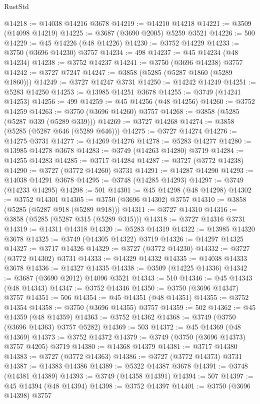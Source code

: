 \begin{lexlean}{RustStd}
\begin{coremodule}
@14218 := @14038 @14216 @3678
@14219 := @14210 @14218
@14221 := @3509 (@14098 @14219)
@14225 := @3687 (@3690 @2005) @5259 @3521
@14226 := 500
@14229 := @45 @14226 (@48 @14226)
@14230 := @3752 @14229
@14233 := @3750 (@3696 @14230) @3757
@14234 := 498
@14237 := @45 @14234 (@48 @14234)
@14238 := @3752 @14237
@14241 := @3750 (@3696 @14238) @3757
@14242 := @3727 @7247
@14247 := @3858 (@5285 (@5287 @1860 (@5289 @1860)))
@14249 := @3727 @14247 @3731
@14250 := @14242 @14249
@14251 := @5283 @14250
@14253 := @13985 @14251 @3678
@14255 := @3749 (@14241 @14253)
@14256 := 499
@14259 := @45 @14256 (@48 @14256)
@14260 := @3752 @14259
@14263 := @3750 (@3696 @14260) @3757
@14268 := @3858 (@5285 (@5287 @339 (@5289 @339)))
@14269 := @3727 @14268
@14274 := @3858 (@5285 (@5287 @646 (@5289 @646)))
@14275 := @3727 @14274
@14276 := @14275 @3731
@14277 := @14269 @14276
@14278 := @5283 @14277
@14280 := @13985 @14278 @3678
@14283 := @3749 (@14263 @14280) @3719
@14284 := @14255 @14283
@14285 := @3717 @14284
@14287 := @3727 (@3772 @14238)
@14290 := @3727 (@3772 @14260) @3731
@14291 := @14287 @14290
@14293 := @14038 @14291 @3678
@14295 := @3748 (@14285 @14293)
@14297 := @3749 (@14233 @14295)
@14298 := 501
@14301 := @45 @14298 (@48 @14298)
@14302 := @3752 @14301
@14305 := @3750 (@3696 @14302) @3757
@14310 := @3858 (@5285 (@5287 @918 (@5289 @918)))
@14311 := @3727 @14310
@14316 := @3858 (@5285 (@5287 @315 (@5289 @315)))
@14318 := @3727 @14316 @3731
@14319 := @14311 @14318
@14320 := @5283 @14319
@14322 := @13985 @14320 @3678
@14325 := @3749 (@14305 @14322) @3719
@14326 := @14297 @14325
@14327 := @3717 @14326
@14329 := @3727 (@3772 @14230)
@14332 := @3727 (@3772 @14302) @3731
@14333 := @14329 @14332
@14335 := @14038 @14333 @3678
@14336 := @14327 @14335
@14338 := @3509 (@14225 @14336)
@14342 := @3687 (@3690 @2012) @14096 @3521
@14343 := 510
@14346 := @45 @14343 (@48 @14343)
@14347 := @3752 @14346
@14350 := @3750 (@3696 @14347) @3757
@14351 := 506
@14354 := @45 @14351 (@48 @14351)
@14355 := @3752 @14354
@14358 := @3750 (@3696 @14355) @3757
@14359 := 502
@14362 := @45 @14359 (@48 @14359)
@14363 := @3752 @14362
@14368 := @3749 (@3750 (@3696 @14363) @3757 @5282)
@14369 := 503
@14372 := @45 @14369 (@48 @14369)
@14373 := @3752 @14372
@14379 := @3749 (@3750 (@3696 @14373) @3757 @4205) @3719
@14380 := @14368 @14379
@14381 := @3717 @14380
@14383 := @3727 (@3772 @14363)
@14386 := @3727 (@3772 @14373) @3731
@14387 := @14383 @14386
@14389 := @5322 @14387 @3678
@14391 := @3748 (@14381 @14389)
@14393 := @3749 (@14358 @14391)
@14394 := 507
@14397 := @45 @14394 (@48 @14394)
@14398 := @3752 @14397
@14401 := @3750 (@3696 @14398) @3757

\end{coremodule}
\end{lexlean}
